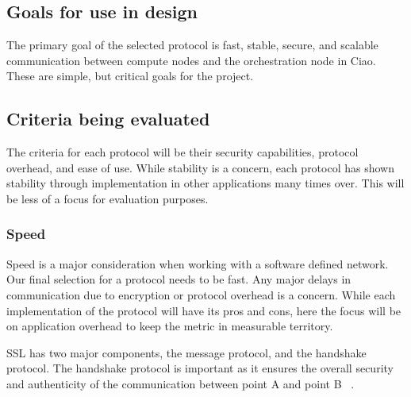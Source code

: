 \documentclass[10pt,letterpaper,onecolumn,journal]{IEEEtran}
\begin{document}
\subsection{Goals for use in design}
The primary goal of the selected protocol is fast, stable, secure, and
scalable communication between compute nodes and the orchestration node in
Ciao. These are simple, but critical goals for the project.

\subsection{Criteria being evaluated}
The criteria for each protocol will be their security capabilities, protocol
overhead, and ease of use. While stability is a concern, each protocol has
shown stability through implementation in other applications many times over.
This will be less of a focus for evaluation purposes.

\subsubsection{Speed}
Speed is a major consideration when working with a software defined network.
Our final selection for a protocol needs to be fast. Any major delays in
communication due to encryption or protocol overhead is a concern. While each
implementation of the protocol will have its pros and cons, here the focus
will be on application overhead to keep the metric in measurable territory.

SSL has two major components, the message protocol, and the handshake protocol. The
handshake protocol is important as it ensures the overall security and
authenticity of the communication between point A and point B
~\cite{topdown-ssl}.
\end{document}
